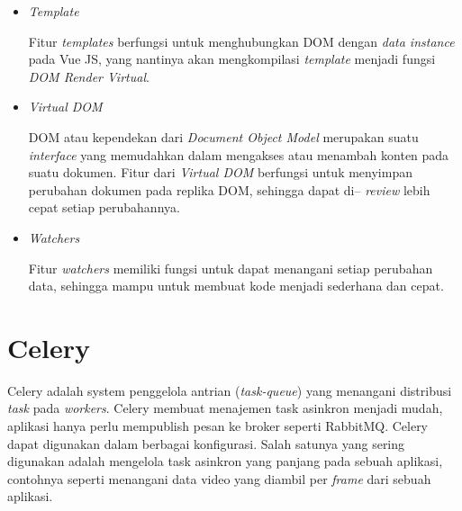 {{\begin{itemize}
  \item \textit{Template}
  
  Fitur \textit{templates} berfungsi untuk menghubungkan DOM dengan \textit{data instance} pada Vue JS, yang nantinya akan mengkompilasi \textit{template} menjadi fungsi \textit{DOM Render Virtual}.

  \item \textit{Virtual DOM}
  
  DOM atau kependekan dari \textit{Document Object Model} merupakan suatu \textit{interface} yang memudahkan dalam mengakses atau menambah konten pada suatu dokumen. Fitur dari \textit{Virtual DOM} berfungsi untuk menyimpan perubahan dokumen pada replika DOM, sehingga dapat di-- \textit{review} lebih cepat setiap perubahannya.

  \item \textit{Watchers}
  
  Fitur \textit{watchers} memiliki fungsi untuk dapat menangani setiap perubahan data, sehingga mampu untuk membuat kode menjadi sederhana dan cepat.



\end{itemize}

\section{Celery}

Celery adalah system penggelola antrian (\textit{task-queue}) yang menangani distribusi \textit{task} pada \textit{workers}.
Celery membuat menajemen task asinkron menjadi mudah, aplikasi hanya perlu mempublish pesan ke broker seperti RabbitMQ.
Celery dapat digunakan dalam berbagai konfigurasi.
Salah satunya yang sering digunakan adalah mengelola task asinkron yang panjang pada sebuah aplikasi,
contohnya seperti menangani data video yang diambil per \textit{frame} dari sebuah aplikasi.




}}
